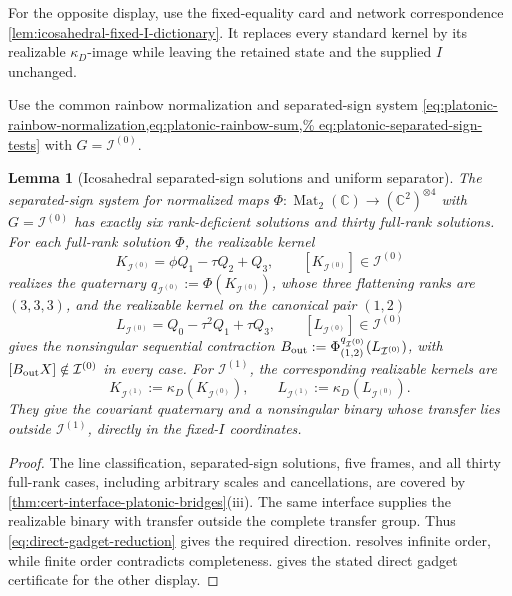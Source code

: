 \documentclass[11pt,letterpaper,onecolumn]{article}
\theoremstyle{plain}
\newtheorem{lemma}[lemma]{Lemma}
\theoremstyle{definition}
\theoremstyle{remark}
\newcommand{\IcoZero}{{\mathcal I^{(0)}}}
\newcommand{\IcoOne}{{\mathcal I^{(1)}}}
\newcommand{\Mat}{\operatorname{Mat}}
\begin{document}
For the opposite display, use the fixed-equality card and network correspondence
\cref{lem:icosahedral-fixed-I-dictionary}.  It replaces every standard
kernel by its realizable \(\kappa_D\)-image while leaving the retained state and
the supplied \(I\) unchanged.

Use the common rainbow normalization and separated-sign system
\cref{eq:platonic-rainbow-normalization,eq:platonic-rainbow-sum,%
eq:platonic-separated-sign-tests} with \(G=\IcoZero\).

\begin{lemma}[Icosahedral separated-sign solutions and uniform separator]
\label{lem:icosahedral-bridge}
\label{lem:icosahedral-separator}
The separated-sign system for normalized maps
\(\Phi:\Mat_2(\mathbb C)\to(\mathbb C^2)^{\otimes4}\) with
\(G=\IcoZero\) has exactly six rank-deficient solutions and thirty full-rank
solutions.  For each full-rank solution \(\Phi\), the realizable kernel
\begin{equation*}
  K_{\IcoZero}=\phi Q_1-\tau Q_2+Q_3,
  \qquad [K_{\IcoZero}]\in\IcoZero
\end{equation*}
realizes the quaternary \(q_{\IcoZero}:=\Phi(K_{\IcoZero})\), whose
three flattening ranks are \((3,3,3)\), and the realizable kernel on
the canonical pair \((1,2)\)
\begin{equation*}
  L_{\IcoZero}=Q_0-\tau^2Q_1+\tau Q_3,
  \qquad [L_{\IcoZero}]\in\IcoZero
\end{equation*}
gives the nonsingular sequential contraction
\(B_{\rm out}:=\Phi_{(1,2)}^{q_{\IcoZero}}(L_{\IcoZero})\), with
\([B_{\rm out}X]\notin\IcoZero\) in every case.
For \(\IcoOne\), the corresponding realizable kernels are
\[
 K_{\IcoOne}:=\kappa_D(K_{\IcoZero}),\qquad
 L_{\IcoOne}:=\kappa_D(L_{\IcoZero}).
\]
They give the covariant quaternary and a nonsingular binary whose transfer
lies outside \(\IcoOne\), directly in the fixed-\(I\) coordinates.
\end{lemma}

\begin{proof}
The line classification, separated-sign solutions, five frames, and
all thirty full-rank cases, including arbitrary scales and cancellations,
are covered by
\cref{thm:cert-interface-platonic-bridges}\textnormal{(iii)}.
The same interface supplies the realizable binary with transfer outside the complete transfer group.  Thus
\cref{eq:direct-gadget-reduction} gives the required direction.
 resolves
infinite order, while finite order contradicts completeness.
 gives the stated direct gadget certificate for the other display.
\end{proof}
\end{document}
